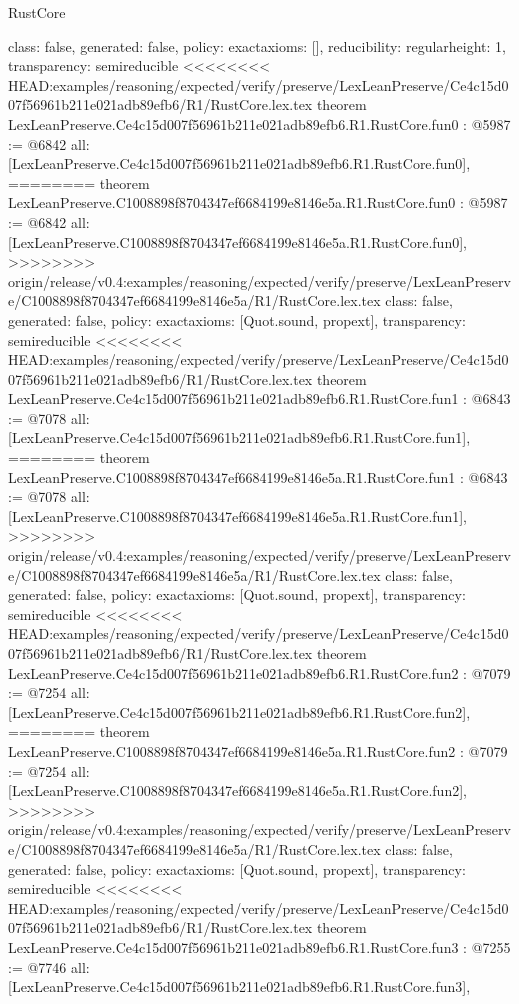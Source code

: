 \begin{lexlean}{RustCore}
\begin{coremodule}
{\begin{coremodule}
{{{  class: false,
  generated: false,
  policy: exact{axioms: []},
  reducibility: regular{height: 1},
  transparency: semireducible
}
<<<<<<<< HEAD:examples/reasoning/expected/verify/preserve/LexLeanPreserve/Ce4c15d007f56961b211e021adb89efb6/R1/RustCore.lex.tex
theorem LexLeanPreserve.Ce4c15d007f56961b211e021adb89efb6.R1.RustCore.fun0 : @5987 := @6842 {
  all: [LexLeanPreserve.Ce4c15d007f56961b211e021adb89efb6.R1.RustCore.fun0],
========
theorem LexLeanPreserve.C1008898f8704347ef6684199e8146e5a.R1.RustCore.fun0 : @5987 := @6842 {
  all: [LexLeanPreserve.C1008898f8704347ef6684199e8146e5a.R1.RustCore.fun0],
>>>>>>>> origin/release/v0.4:examples/reasoning/expected/verify/preserve/LexLeanPreserve/C1008898f8704347ef6684199e8146e5a/R1/RustCore.lex.tex
  class: false,
  generated: false,
  policy: exact{axioms: [Quot.sound, propext]},
  transparency: semireducible
}
<<<<<<<< HEAD:examples/reasoning/expected/verify/preserve/LexLeanPreserve/Ce4c15d007f56961b211e021adb89efb6/R1/RustCore.lex.tex
theorem LexLeanPreserve.Ce4c15d007f56961b211e021adb89efb6.R1.RustCore.fun1 : @6843 := @7078 {
  all: [LexLeanPreserve.Ce4c15d007f56961b211e021adb89efb6.R1.RustCore.fun1],
========
theorem LexLeanPreserve.C1008898f8704347ef6684199e8146e5a.R1.RustCore.fun1 : @6843 := @7078 {
  all: [LexLeanPreserve.C1008898f8704347ef6684199e8146e5a.R1.RustCore.fun1],
>>>>>>>> origin/release/v0.4:examples/reasoning/expected/verify/preserve/LexLeanPreserve/C1008898f8704347ef6684199e8146e5a/R1/RustCore.lex.tex
  class: false,
  generated: false,
  policy: exact{axioms: [Quot.sound, propext]},
  transparency: semireducible
}
<<<<<<<< HEAD:examples/reasoning/expected/verify/preserve/LexLeanPreserve/Ce4c15d007f56961b211e021adb89efb6/R1/RustCore.lex.tex
theorem LexLeanPreserve.Ce4c15d007f56961b211e021adb89efb6.R1.RustCore.fun2 : @7079 := @7254 {
  all: [LexLeanPreserve.Ce4c15d007f56961b211e021adb89efb6.R1.RustCore.fun2],
========
theorem LexLeanPreserve.C1008898f8704347ef6684199e8146e5a.R1.RustCore.fun2 : @7079 := @7254 {
  all: [LexLeanPreserve.C1008898f8704347ef6684199e8146e5a.R1.RustCore.fun2],
>>>>>>>> origin/release/v0.4:examples/reasoning/expected/verify/preserve/LexLeanPreserve/C1008898f8704347ef6684199e8146e5a/R1/RustCore.lex.tex
  class: false,
  generated: false,
  policy: exact{axioms: [Quot.sound, propext]},
  transparency: semireducible
}
<<<<<<<< HEAD:examples/reasoning/expected/verify/preserve/LexLeanPreserve/Ce4c15d007f56961b211e021adb89efb6/R1/RustCore.lex.tex
theorem LexLeanPreserve.Ce4c15d007f56961b211e021adb89efb6.R1.RustCore.fun3 : @7255 := @7746 {
  all: [LexLeanPreserve.Ce4c15d007f56961b211e021adb89efb6.R1.RustCore.fun3],
}}}}}}
\end{coremodule}}
\end{coremodule}
\end{lexlean}
